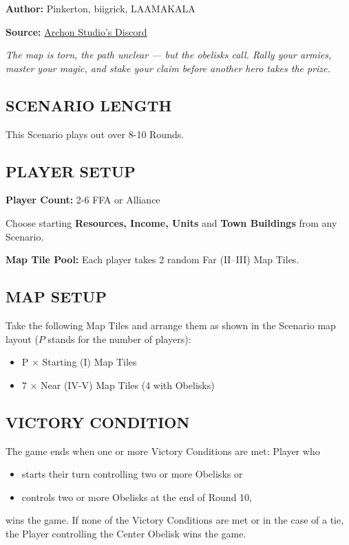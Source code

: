 
\begin{multicols*}{2}

\textbf{Author:} Pinkerton, biigrick, LAAMAKALA

\textbf{Source:} \href{https://discord.com/channels/740870068178649108/1232319328049954826}{Archon Studio's Discord}

\textit{The map is torn, the path unclear — but the obelisks call. Rally your armies, master your magic, and stake your claim before another hero takes the prize.}  %

\subsection*{\MakeUppercase{Scenario Length}}
This Scenario plays out over 8-10 Rounds.

\subsection*{\MakeUppercase{Player Setup}}
\textbf{Player Count:} 2-6 FFA or Alliance

Choose starting \textbf{Resources, Income, Units} and \textbf{Town Buildings} from any Scenario.

\textbf{Map Tile Pool:} Each player takes 2 random Far (II--III) Map Tiles.

\subsection*{\MakeUppercase{Map Setup}}
Take the following Map Tiles and arrange them as shown in the Scenario map layout ($P$ stands for the number of players):

\begin{itemize}
  \item P × Starting (I) Map Tiles
  \item 7 × Near (IV-V) Map Tiles (4 with Obelisks)
\end{itemize}

\subsection*{\MakeUppercase{Victory Condition}}
The game ends when one or more Victory Conditions are met: Player who
\begin{itemize}
  \item starts their turn controlling two or more Obelisks or
  \item controls two or more Obelisks at the end of Round 10,
\end{itemize}
wins the game. If none of the Victory Conditions are met or in the case of a tie, the Player controlling the Center Obelisk wins the game.


\end{multicols*}
